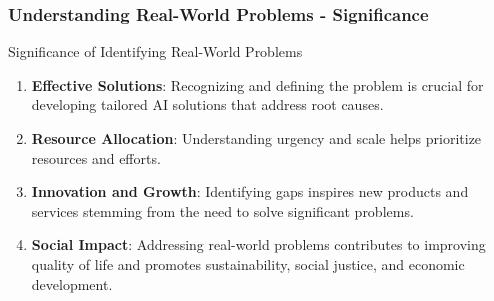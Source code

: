 \documentclass{beamer}
\begin{document}
\begin{frame}[fragile]
    \frametitle{Understanding Real-World Problems - Significance}
    \begin{block}{Significance of Identifying Real-World Problems}
        \begin{enumerate}
            \item \textbf{Effective Solutions}: Recognizing and defining the problem is crucial for developing tailored AI solutions that address root causes.
            \item \textbf{Resource Allocation}: Understanding urgency and scale helps prioritize resources and efforts.
            \item \textbf{Innovation and Growth}: Identifying gaps inspires new products and services stemming from the need to solve significant problems.
            \item \textbf{Social Impact}: Addressing real-world problems contributes to improving quality of life and promotes sustainability, social justice, and economic development.
        \end{enumerate}
    \end{block}
\end{frame}
\end{document}
